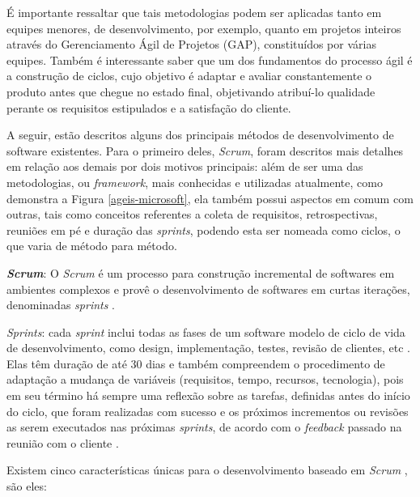 É importante ressaltar que tais metodologias podem ser aplicadas tanto em equipes menores, de desenvolvimento, por exemplo, quanto em projetos inteiros através do Gerenciamento Ágil de Projetos (GAP), constituídos por várias equipes. Também é interessante saber que um dos fundamentos do processo ágil é a construção de ciclos, cujo objetivo é adaptar e avaliar constantemente o produto antes que chegue no estado final, objetivando atribuí-lo qualidade perante os requisitos estipulados e a satisfação do cliente.

A seguir, estão descritos alguns dos principais métodos de desenvolvimento de software existentes. Para o primeiro deles, \textit{Scrum}, foram descritos mais detalhes em relação aos demais por dois motivos principais: além de ser uma das metodologias, ou \textit{framework}, mais conhecidas e utilizadas atualmente, como demonstra a Figura \ref{ageis-microsoft}, ela também possui aspectos em comum com outras, tais como conceitos referentes a coleta de requisitos, retrospectivas, reuniões em pé e duração das \textit{sprints}, podendo esta ser nomeada como ciclos, o que varia de método para método.


\textbf{\textit{Scrum}}: O \textit{Scrum} é um processo para construção incremental de softwares em ambientes complexos e provê o desenvolvimento de softwares em curtas iterações, denominadas \textit{sprints} \cite{rising2000scrum}.

\textit{Sprints}: cada \textit{sprint} inclui todas as fases de um software modelo de ciclo de vida de desenvolvimento, como design, implementação, testes, revisão de clientes, etc \cite[~p. 2, tradução nossa]{matharu2015empirical}. Elas têm duração de até 30 dias e também compreendem o procedimento de adaptação a mudança de variáveis (requisitos, tempo, recursos, tecnologia), pois em seu término há sempre uma reflexão sobre as tarefas, definidas antes do início do ciclo, que foram realizadas com sucesso e os próximos incrementos ou revisões as serem executados nas próximas \textit{sprints}, de acordo com o \textit{feedback} passado na reunião com o cliente . 

Existem cinco características únicas para o desenvolvimento baseado em \textit{Scrum} \cite{matharu2015empirical}, são eles:

